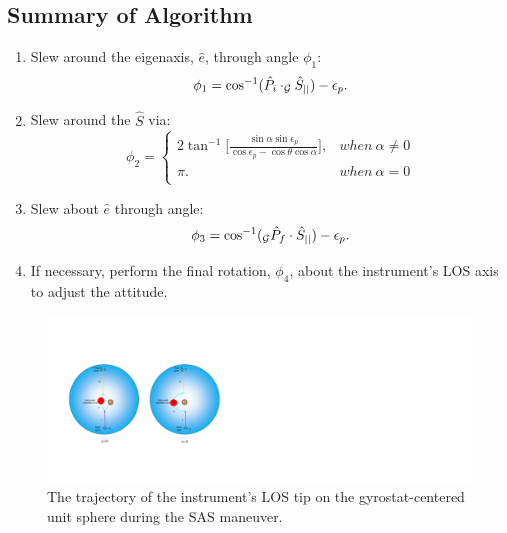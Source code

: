 \documentclass[journal ]{new-aiaa}
\begin{document}
	\subsection{Summary of Algorithm} 	
	\begin{enumerate}
		\item Slew around the eigenaxis, $\hat{e}$, through angle $\phi_1$:		
		\begin{equation}\label{phi1}
		\phi_1 = \cos^{-1}(\hat{P}_i\cdot_\mathcal{G}\hat{S}_{||})-\epsilon_p.\\
		\end{equation}
		\item Slew around the $\hat{S}$ via:
		\begin{equation}\label{phi2}
		\phi_2=\left\{
		\begin{array}{ll}
		2\tan^{-1}\Big[ \frac{\sin\alpha \sin\epsilon_p}{\cos\epsilon_p-\cos\theta\cos\alpha}\Big],& when\  \alpha\neq 0\\
		\pi.& when\ \alpha=0\\
		\end{array}
		\right.
		\end{equation}
		\item Slew about $\hat{e}$ through angle:
		\begin{equation}\label{phi3}
		\phi_3 = \cos^{-1}(_\mathcal{G}\hat{P}_f\cdot\hat{S}_{||})-\epsilon_p.\\
		\end{equation}		
		\item If necessary, perform the final rotation, $\phi_4$, about the instrument's LOS axis to adjust the attitude. 
	\end{enumerate}
	
	
	\begin{figure}[h!]
		\centering
		\includegraphics[width=6in]{./Figures/SASSchematic3}
		\caption{The trajectory of the instrument's LOS tip on the gyrostat-centered unit sphere during the SAS maneuver.}
	\end{figure}
	
\end{document}
